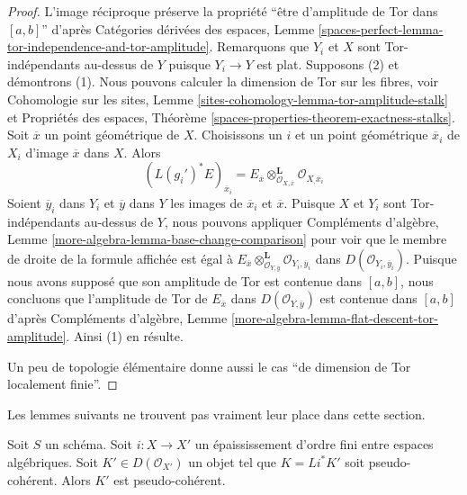 \begin{proof}
L'image réciproque préserve la propriété ``être d'amplitude de Tor dans $[a, b]$'' d'après
Catégories dérivées des espaces, Lemme
\ref{spaces-perfect-lemma-tor-independence-and-tor-amplitude}.
Remarquons que $Y_i$ et $X$ sont Tor-indépendants au-dessus de $Y$
puisque $Y_i \to Y$ est plat. Supposons (2) et démontrons (1).
Nous pouvons calculer la dimension de Tor sur les fibres, voir
Cohomologie sur les sites, Lemme \ref{sites-cohomology-lemma-tor-amplitude-stalk}
et Propriétés des espaces, Théorème
\ref{spaces-properties-theorem-exactness-stalks}.
Soit $\overline{x}$ un point géométrique de $X$. Choisissons
un $i$ et un point géométrique $\overline{x}_i$ de $X_i$ d'image
$\overline{x}$ dans $X$. Alors
$$
(L(g_i')^*E)_{\overline{x}_i} =
E_{\overline{x}}
\otimes_{\mathcal{O}_{X, \overline{x}}}^\mathbf{L}
\mathcal{O}_{X_, \overline{x}_i}
$$
Soient $\overline{y}_i$ dans $Y_i$ et $\overline{y}$ dans $Y$
les images de $\overline{x}_i$ et $\overline{x}$.
Puisque $X$ et $Y_i$ sont Tor-indépendants au-dessus de $Y$, nous pouvons appliquer
Compléments d'algèbre, Lemme \ref{more-algebra-lemma-base-change-comparison}
pour voir que le membre de droite de la formule affichée est égal à
$E_{\overline{x}}
\otimes_{\mathcal{O}_{Y, \overline{y}}}^\mathbf{L}
\mathcal{O}_{Y_i, \overline{y}_i}$
dans $D(\mathcal{O}_{Y_i, \overline{y}_i})$.
Puisque nous avons supposé que son amplitude de Tor est contenue dans
$[a, b]$, nous concluons que l'amplitude de Tor de
$E_{\overline{x}}$ dans $D(\mathcal{O}_{Y, \overline{y}})$
est contenue dans $[a, b]$ d'après Compléments d'algèbre, Lemme
\ref{more-algebra-lemma-flat-descent-tor-amplitude}.
Ainsi (1) en résulte.

\medskip\noindent
Un peu de topologie élémentaire donne aussi le cas
``de dimension de Tor localement finie''.
\end{proof}

\noindent
Les lemmes suivants ne trouvent pas vraiment leur place dans cette section.

\begin{lemma}
\label{lemma-thickening-pseudo-coherent}
Soit $S$ un schéma. Soit $i : X \to X'$ un épaississement d'ordre fini entre
espaces algébriques. Soit $K' \in D(\mathcal{O}_{X'})$ un objet tel que
$K = Li^*K'$ soit pseudo-cohérent. Alors $K'$ est pseudo-cohérent.
\end{lemma}


